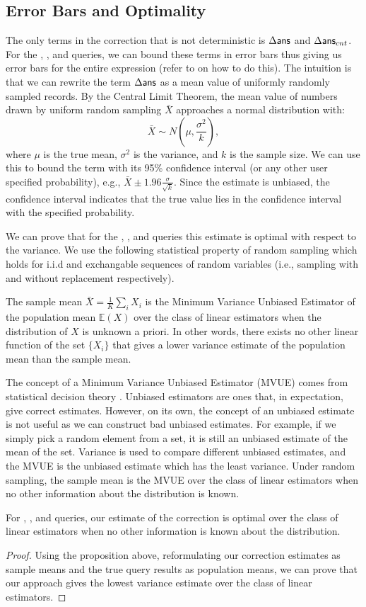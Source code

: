 \subsection{Error Bars and Optimality}\label{subsec:correct-practical}
The only terms in the correction that is not deterministic is $\Delta\textsf{ans}$ and $\Delta\textsf{ans}_{cnt}$.
For the \sumfunc, \countfunc, and \avgfunc queries, we can bound these terms in error bars thus giving us error bars for the entire expression (refer to \cite{wang1999sample} on how to do this).
The intuition is that we can rewrite the term $\Delta\textsf{ans}$ as a mean value of uniformly randomly sampled records.
By the Central Limit Theorem, the mean value of numbers drawn by uniform random sampling $\bar{X}$ approaches a normal distribution with:
\[
\bar{X} \sim N(\mu,\frac{\sigma^2}{k}),
\]
where $\mu$ is the true mean, $\sigma^2$ is the variance, and $k$ is the sample size.
We can use this to bound the term with its 95\% confidence interval (or any other user specified probability), e.g., $\bar{X} \pm 1.96 \frac{\sigma}{\sqrt{k}}$.
Since the estimate is unbiased, the confidence interval indicates that the true value lies in the confidence interval with the specified probability.

We can prove that for the \sumfunc, \countfunc, and \avgfunc queries this estimate is optimal with respect to the variance.
We use the following statistical property of random sampling which holds for i.i.d and exchangable sequences of random variables (i.e., sampling with and without replacement respectively).
\begin{proposition}
The sample mean $\bar{X} = \frac{1}{K}\sum_i X_i$ is the Minimum Variance Unbiased Estimator of the population mean $\mathbb{E}(X)$ over the class of linear estimators when the distribution of $X$ is unknown a priori. In other words, there exists no other linear function of the set $\{ X_i \}$ that gives a lower variance estimate of the population mean than the sample mean.
\end{proposition}
The concept of a Minimum Variance Unbiased Estimator (MVUE) comes from statistical decision theory \cite{cox1979theoretical}.
Unbiased estimators are ones that, in expectation, give correct estimates.
However, on its own, the concept of an unbiased estimate is not useful as we can construct bad unbiased estimates.
For example, if we simply pick a random element from a set, it is still an unbiased estimate of the mean of the set.
Variance is used to compare different unbiased estimates, and the MVUE is the unbiased estimate which has the least variance.
Under random sampling, the sample mean is the MVUE over the class of linear estimators when no other information about the distribution is known.
\begin{theorem}
For \sumfunc, \countfunc, and \avgfunc queries, our estimate of the correction is optimal over the class of linear estimators when no other information is known about the distribution. 
\end{theorem}
\begin{proof}
Using the proposition above, reformulating our correction estimates as sample means and the true query results as population means, we can prove that our approach gives the lowest variance estimate over the class of linear estimators.
\end{proof}